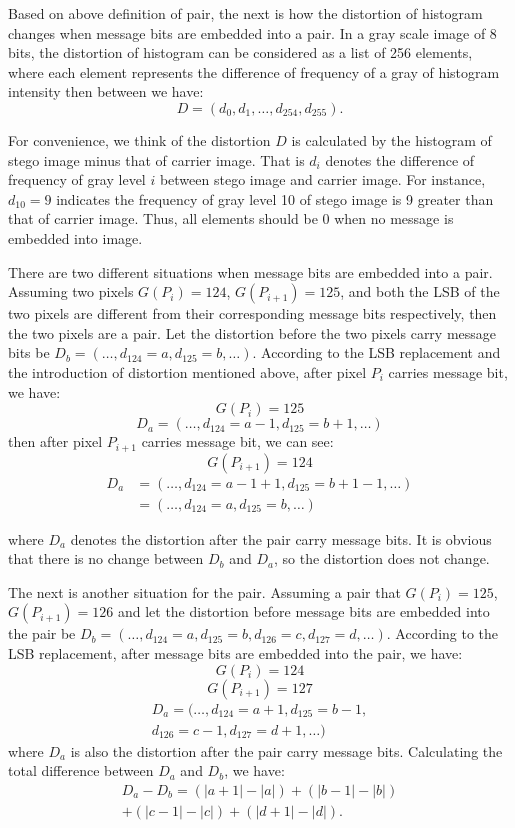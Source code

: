 \documentclass[a4paper,10pt,twocolumn]{article}
\begin{document}
Based on above definition of pair, the next is how the distortion of
histogram changes when message bits are embedded into a pair. In a gray
scale image of 8 bits, the distortion of histogram can be considered as a list of
256 elements, where each element represents the difference of frequency of a
gray of histogram intensity then between we have:
$$ D = (d_0, d_1, \ldots, d_{254}, d_{255}). $$

For convenience, we think of the distortion $D$ is calculated by the histogram of stego
image minus that of carrier image. That is $d_i$ denotes the difference of frequency of
gray level $i$ between stego image and carrier image. For instance, $d_{10} = 9$
indicates the frequency of gray level 10 of stego image is 9 greater than that of carrier
image. Thus, all elements should be 0 when no message is embedded into image.

There are two different situations when message bits are embedded into a pair.
Assuming two pixels $G(P_i) = 124$, $G(P_{i+1}) = 125$, and both the LSB of
the two pixels are different from their corresponding message bits respectively,
then the two pixels are a pair. Let the distortion before the two pixels carry
message bits be $D_b = (\ldots, d_{124}=a, d_{125}=b, \ldots)$. According to
the LSB replacement and the introduction of distortion mentioned above, after
pixel $P_i$ carries message bit, we have:
$$ G(P_i) = 125 $$
$$ D_a = (\ldots, d_{124}=a-1, d_{125}=b+1, \ldots) $$
then after pixel $P_{i+1}$ carries message bit, we can see:
$$G(P_{i+1}) = 124$$
\begin{align*}
 D_a &= (\ldots, d_{124}=a-1+1, d_{125}=b+1-1, \ldots) \\
     &= (\ldots, d_{124}=a, d_{125}=b, \ldots)
\end{align*}

where $D_a$ denotes the distortion after the pair carry message bits. It is
obvious that there is no change between $D_b$ and $D_a$, so the distortion
does not change.

The next is another situation for the pair. Assuming a pair that $G(P_i) =125$,
$G(P_{i+1}) =126$ and let the distortion before message bits are embedded into
the pair be $D_b = (\ldots, d_{124}=a,d_{125}=b,d_{126}=c,d_{127}=d, \ldots)$.
According to the LSB replacement, after message bits are embedded into the
pair, we have:
$$ G(P_i) = 124$$
$$ G(P_{i+1}) = 127$$
\begin{multline*}
 D_a = (\ldots, d_{124}=a+1, d_{125}=b-1, \\ 
 d_{126}=c-1, d_{127}=d+1, \ldots)
 \end{multline*}
where $D_a$ is also the distortion after the pair carry message bits. Calculating
the total difference between $D_a$ and $D_b$, we have:
\begin{multline*}
D_a - D_b = (|a+1| - |a|) + (|b-1|-|b|) \\ 
+ (|c-1|-|c|) + (|d+1|-|d|). 
\end{multline*}
\end{document}
